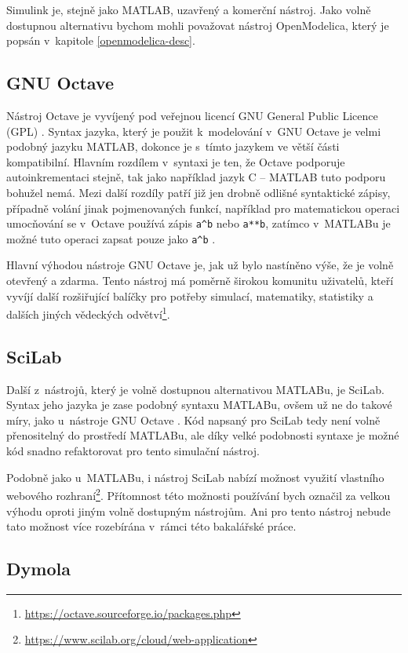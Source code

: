 Simulink je, stejně jako MATLAB, uzavřený a komerční nástroj. Jako volně dostupnou alternativu bychom mohli považovat nástroj OpenModelica, který je popsán v~kapitole \ref{openmodelica-desc}.

\subsection{GNU Octave}
\label{octave-desc}
Nástroj Octave je vyvíjený pod veřejnou licencí GNU General Public Licence (GPL) \cite{OctaveManual}. Syntax jazyka, který je použit k~modelování v~GNU Octave je velmi podobný jazyku MATLAB, dokonce je s~tímto jazykem ve větší části kompatibilní. Hlavním rozdílem v~syntaxi je ten, že Octave podporuje autoinkrementaci stejně, tak jako například jazyk C -- MATLAB tuto podporu bohužel nemá.
Mezi další rozdíly patří již jen drobně odlišné syntaktické zápisy, případně volání jinak pojmenovaných funkcí, například pro matematickou operaci umocňování se v~Octave používá zápis \texttt{a\^\space b} nebo \texttt{a**b}, zatímco v~MATLABu je možné tuto operaci zapsat pouze jako \texttt{a\^\space b} \cite{OctaveManual}.

Hlavní výhodou nástroje GNU Octave je, jak už bylo nastíněno výše, že je volně otevřený a zdarma. Tento nástroj má poměrně širokou komunitu uživatelů, kteří vyvíjí další rozšiřující balíčky pro potřeby simulací, matematiky, statistiky a dalších jiných vědeckých odvětví\footnote{\url{https://octave.sourceforge.io/packages.php}}.

\subsection{SciLab}
\label{scilab-desc}
Další z~nástrojů, který je volně dostupnou alternativou MATLABu, je SciLab. Syntax jeho jazyka je zase podobný syntaxu MATLABu, ovšem už ne do takové míry, jako u~nástroje GNU Octave \cite{Gilberto}. Kód napsaný pro SciLab tedy není volně přenositelný do prostředí MATLABu, ale díky velké podobnosti syntaxe je možné kód snadno refaktorovat pro tento simulační nástroj.

Podobně jako u~MATLABu, i nástroj SciLab nabízí možnost využití vlastního webového rozhraní\footnote{\url{https://www.scilab.org/cloud/web-application}}. Přítomnost této možnosti používání bych označil za velkou výhodu oproti jiným volně dostupným nástrojům. Ani pro tento nástroj nebude tato možnost více rozebírána v~rámci této bakalářské práce.

\subsection{Dymola}
\label{dymola-desc}

